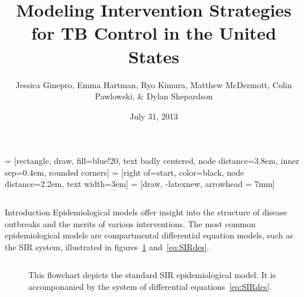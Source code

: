 \documentclass[final]{beamer}
\title{\huge Modeling Intervention Strategies for TB Control in the United States}
\author{Jessica Ginepro, Emma Hartman, Ryo Kimura, Matthew McDermott, Colin
        Pawlowski, \& Dylan Shepardson}
\institute[MHC]{Mathematical Modeling Group, Mount Holyoke College, South
                Hadley, MA, USA}
\date[July 31, 2013]{July 31, 2013}
\begin{document}
 = [rectangle, draw, fill=blue!20, text badly centered,
  node distance=3.8em, inner sep=0.4em, rounded corners]
 = [right of=start, color=black, node distance=2.2em,
text width=3em]
 = [draw, -latexnew, arrowhead = 7mm]


\begin{frame}
  \begin{columns}
    \begin{column}{.3\textwidth}
      \vspace{-8em}
      \begin{block}{Introduction}
        Epidemiological models offer insight into the structure of disease
        outbreaks and the merits of various interventions. The most common
        epidemiological models are compartmental differential equation models,
        such as the SIR system, illustrated in figures~\ref{fig:SIRFlowchart}
        and~\ref{eq:SIRdes}. 
        \vspace{-2em}
        \begin{block}{}
          \begin{column}{.39\textwidth}
            \begin{figure}[h]
              \begin{center}
              \end{center}
              \caption{This flowchart depicts the standard SIR epidemiological
                       model. It is accomponanied by the system of differential
                       equations~\ref{eq:SIRdes}.}
              \label{fig:SIRFlowchart}
            \end{figure}
          \end{column}
          \begin{column}{.39\textwidth}
            \begin{figure}[h]
              \begin{align*}

\end{align*}
\end{figure}
\end{column}
\end{block}
\end{block}
\end{column}
\end{columns}
\end{frame}
\end{document}
